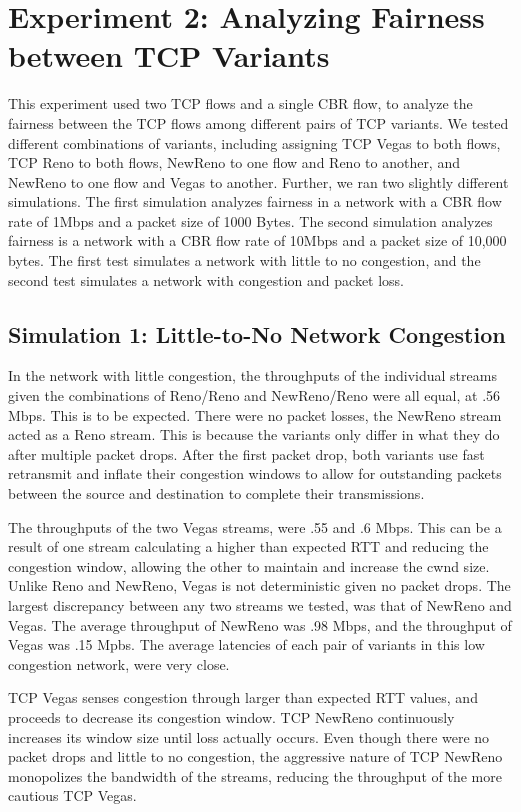 \section{Experiment 2: Analyzing Fairness between TCP Variants}

This experiment used two TCP flows and a single CBR flow, to analyze the fairness between the TCP flows among different pairs of TCP variants. We tested different combinations of variants, including assigning TCP Vegas to both flows, TCP Reno to both flows, NewReno to one flow and Reno to another, and NewReno to one flow and Vegas to another. Further, we ran two slightly different simulations. The first simulation analyzes fairness in a network with a CBR flow rate of 1Mbps and a packet size of 1000 Bytes. The second simulation analyzes fairness is a network with a CBR flow rate of 10Mbps and a packet size of 10,000 bytes. The first test simulates a network with little to no congestion, and the second test simulates a network with congestion and packet loss.

\subsection{Simulation 1: Little-to-No Network Congestion}

In the network with little congestion, the throughputs of the individual streams given the combinations of Reno/Reno and NewReno/Reno were all equal, at .56 Mbps. This is to be expected. There were no packet losses, the NewReno stream acted as a Reno stream. This is because the variants only differ in what they do after multiple packet drops. After the first packet drop, both variants use fast retransmit and inflate their congestion windows to allow for outstanding packets between the source and destination to complete their transmissions. 

The throughputs of the two Vegas streams, were .55 and .6 Mbps. This can be a result of one stream calculating a higher than expected RTT and reducing the congestion window, allowing the other to maintain and increase the cwnd size. Unlike Reno and NewReno, Vegas is not deterministic given no packet drops. The largest discrepancy between any two streams we tested, was that of NewReno and Vegas. The average throughput of NewReno was .98 Mbps, and the throughput of Vegas was .15 Mpbs. The average latencies of each pair of variants in this low congestion network, were very close.

TCP Vegas senses congestion through larger than expected RTT values, and proceeds to decrease its congestion window. TCP NewReno continuously increases its window size until loss actually occurs. Even though there were no packet drops and little to no congestion, the aggressive nature of TCP NewReno monopolizes the bandwidth of the streams, reducing the throughput of the more cautious TCP Vegas.

